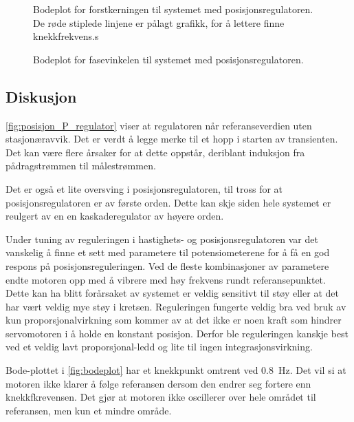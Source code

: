\begin{figure}[h]
    \centering
    
    \caption{Bodeplot for forstkerningen til systemet med posisjonsregulatoren. De røde stiplede linjene er pålagt grafikk, for å lettere finne knekkfrekvens.s}
    \label{fig:bodeplot}
\end{figure}

\begin{figure}[h]
    \centering
    
    \caption{Bodeplot for fasevinkelen til systemet med posisjonsregulatoren.}
    \label{fig:bodeplot_fase}
\end{figure}







\subsection{Diskusjon}

\autoref{fig:posisjon_P_regulator} viser at regulatoren når referanseverdien uten stasjonæravvik. Det er verdt å legge merke til et hopp i starten av transienten. 
Det kan være flere årsaker for at dette oppstår, deriblant induksjon fra pådragstrømmen til målestrømmen.

Det er også et lite oversving i posisjonsregulatoren, til tross for at posisjonsregulatoren er av første orden. Dette kan skje siden hele systemet er reulgert av en en kaskaderegulator av høyere orden.

Under tuning av reguleringen i hastighets- og posisjonsregulatoren var det vanskelig å finne et sett med parametere til potensiometerene for å få en god respons på posisjonsreguleringen. 
Ved de fleste kombinasjoner av parametere endte motoren opp med å vibrere med høy frekvens rundt referansepunktet. 
Dette kan ha blitt forårsaket av systemet er veldig sensitivt til støy eller at det har vært veldig mye støy i kretsen.
Reguleringen fungerte veldig bra ved bruk av kun proporsjonalvirkning som kommer av at det ikke er noen kraft som hindrer servomotoren i å holde en konstant posisjon.
Derfor ble reguleringen kanskje best ved et veldig lavt proporsjonal-ledd og lite til ingen integrasjonsvirkning.


Bode-plottet i \autoref{fig:bodeplot} har et knekkpunkt omtrent ved \SI{0.8}{\hertz}. Det vil si at motoren ikke klarer å følge referansen dersom den endrer seg fortere enn knekkfkrevensen. Det gjør at motoren ikke oscillerer over hele området til referansen, men kun et mindre område. 

